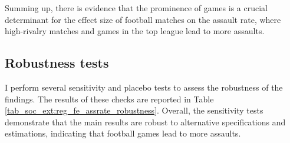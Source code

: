 Summing up, there is evidence that the prominence of games is a crucial determinant for the effect size of football matches on the assault rate, where high-rivalry matches and games in the top league lead to more assaults.












\subsection{Robustness tests}
I perform several sensitivity and placebo tests to assess the robustness of the findings. The results of these checks are reported in Table \ref{tab_soc_ext:reg_fe_assrate_robustness}. Overall, the sensitivity tests demonstrate that the main results are robust to alternative specifications and estimations, indicating that football games lead to more assaults.\newline




